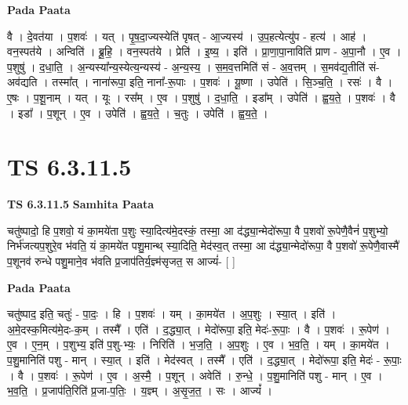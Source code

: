 \documentclass[17pt]{extarticle}
\begin{document}
\textbf{Pada Paata} \newline

वै । दे॒वत॑या । प॒शवः॑ । यत् । पृ॒ष॒दा॒ज्यस्येति॑ पृषत् - आ॒ज्यस्य॑ । उ॒प॒हत्येत्यु॑प - हत्य॑ । आह॑ । वन॒स्पत॑ये । अन्विति॑ । ब्रू॒हि॒ । वन॒स्पत॑ये । प्रेति॑ । इ॒ष्य॒ । इति॑ । प्रा॒णा॒पा॒नाविति॑ प्राण - अ॒पा॒नौ । ए॒व । प॒शुषु॑ । द॒धा॒ति॒ । अ॒न्यस्या᳚न्य॒स्येत्य॒न्यस्य॑ - अ॒न्य॒स्य॒ । स॒म॒व॒त्तमिति॑ सं - अ॒व॒त्तम् । स॒मव॑द्य॒तीति॑ सं-अव॑द्यति । तस्मा᳚त् । नाना॑रूपा॒ इति॒ नाना᳚-रू॒पाः । प॒शवः॑ । यू॒ष्णा । उपेति॑ । सि॒ञ्च॒ति॒ । रसः॑ । वै । ए॒षः । प॒शू॒नाम् । यत् । यूः । रस᳚म् । ए॒व । प॒शुषु॑ । द॒धा॒ति॒ । इडा᳚म् । उपेति॑ । ह्व॒य॒ते॒ । प॒शवः॑ । वै । इडा᳚ । प॒शून् । ए॒व । उपेति॑ । ह्व॒य॒ते॒ । च॒तुः । उपेति॑ । ह्व॒य॒ते॒ ।  \newline





\section{ TS 6.3.11.5 }

\textbf{TS 6.3.11.5 } \newline
\textbf{Samhita Paata} \newline

चतु॑ष्पादो॒ हि प॒शवो॒ यं का॒मये॑ता प॒शुः स्या॒दित्य॑मे॒दस्कं॒ तस्मा॒ आ द॑द्ध्या॒न्मेदो॑रूपा॒ वै प॒शवो॑ रू॒पेणै॒वैनं॑ प॒शुभ्यो॒ निर्भ॑जत्यप॒शुरे॒व भ॑वति॒ यं का॒मये॑त पशु॒मान्थ् स्या॒दिति॒ मेद॑स्व॒त् तस्मा॒ आ द॑द्ध्या॒न्मेदो॑रूपा॒ वै प॒शवो॑ रू॒पेणै॒वास्मै॑ प॒शूनव॑ रुन्धे पशु॒माने॒व भ॑वति प्र॒जाप॑तिर्य॒ज्ञ्म॑सृजत॒ स आज्यं॑- [  ] \newline

\textbf{Pada Paata} \newline

चतु॑ष्पाद॒ इति॒ चतुः॑ - पा॒दः॒ । हि । प॒शवः॑ । यम् । का॒मये॑त । अ॒प॒शुः । स्या॒त् । इति॑ । अ॒मे॒दस्क॒मित्य॑मे॒दः-क॒म् । तस्मै᳚ । एति॑ । द॒द्ध्या॒त् । मेदो॑रूपा॒ इति॒ मेदः॑-रू॒पाः॒ । वै । प॒शवः॑ । रू॒पेण॑ । ए॒व । ए॒न॒म् । प॒शुभ्य॒ इति॑ प॒शु-भ्यः॒ । निरिति॑ । भ॒ज॒ति॒ । अ॒प॒शुः । ए॒व । भ॒व॒ति॒ । यम् । का॒मये॑त । प॒शु॒मानिति॑ पशु - मान् । स्या॒त् । इति॑ । मेद॑स्वत् । तस्मै᳚ । एति॑ । द॒द्ध्या॒त् । मेदो॑रूपा॒ इति॒ मेदः॑ - रू॒पाः॒ । वै । प॒शवः॑ । रू॒पेण॑ । ए॒व । अ॒स्मै॒ । प॒शून् । अवेति॑ । रु॒न्धे॒ । प॒शु॒मानिति॑ पशु - मान् । ए॒व । भ॒व॒ति॒ । प्र॒जाप॑ति॒रिति॑ प्र॒जा-प॒तिः॒ । य॒ज्ञ्म् । अ॒सृ॒ज॒त॒ । सः । आज्यं᳚ ।  \newline
\end{document}
